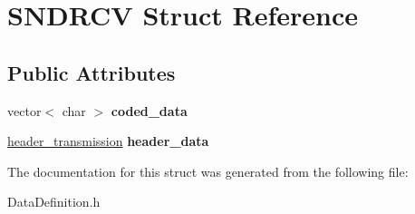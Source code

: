 \hypertarget{structSNDRCV}{\section{S\-N\-D\-R\-C\-V Struct Reference}
\label{structSNDRCV}
}
\subsection*{Public Attributes}
\begin{DoxyCompactItemize}
\item 
\hypertarget{structSNDRCV_af2eba7b9442064592ab69c9d55ea5505}{vector$<$ char $>$ {\bfseries coded\-\_\-data}}\label{structSNDRCV_af2eba7b9442064592ab69c9d55ea5505}

\item 
\hypertarget{structSNDRCV_a5c9177be3ebbacd18d374399d4021850}{\hyperlink{structHEADER__TRANSMISSION}{header\-\_\-transmission} {\bfseries header\-\_\-data}}\label{structSNDRCV_a5c9177be3ebbacd18d374399d4021850}

\end{DoxyCompactItemize}


The documentation for this struct was generated from the following file\-:\begin{DoxyCompactItemize}
\item 
Data\-Definition.\-h\end{DoxyCompactItemize}
